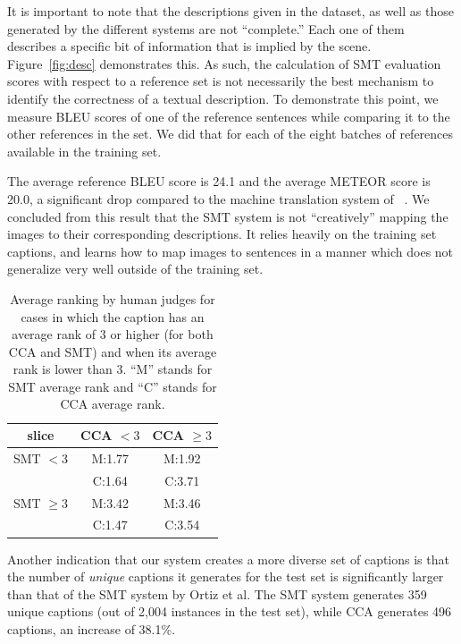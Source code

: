 \documentclass[letterpaper]{article}
\newcommand{\newcite}[1]{\citeauthor{#1}~\shortcite{#1}}
\begin{document}
It is important to note that the descriptions given in the dataset, as well as those generated by the different systems are not ``complete.'' Each one of them describes
a specific bit of information that is implied by the scene. Figure~\ref{fig:desc} demonstrates this. As such, the calculation of SMT evaluation scores with respect to
a reference set is not necessarily the best mechanism to identify the correctness of a textual description.
To demonstrate this point, we measure BLEU scores of one of the reference
sentences while comparing it to the other references in the set. We did that for each of the eight batches of references available in the training set.


The average reference BLEU score is 24.1 and the average METEOR score is 20.0, a significant drop compared to the machine translation system of \newcite{ortiz2015learning}.
We concluded from this result that the SMT system is not ``creatively'' mapping the images to their corresponding descriptions. It relies heavily on the training set captions,
and learns how to map images to sentences in a manner which does not generalize very well outside of the training set.

\begin{table}
\begin{center}
\begin{tabular}{|c||c|c|}
\hline
slice & CCA $< 3$ & CCA $ \ge 3$ \\
\hline
\hline
SMT $< 3$ & M:1.77 & M:1.92 \\
         & C:1.64 & C:3.71 \\
\hline
SMT $\ge 3$ & M:3.42 & M:3.46 \\
         & C:1.47 & C:3.54 \\
\hline
\end{tabular}
\end{center}
\caption{Average ranking by human judges for cases in which the caption has an average rank of $3$ or higher (for both CCA and SMT) and when its average rank is lower than $3$. ``M'' stands for SMT average rank and ``C'' stands for CCA
average rank.\label{table:ranking}}
\end{table}


Another indication that our system creates a more diverse set of captions is that the number of {\em unique} captions it generates for the test set
is significantly larger than that of the SMT system by Ortiz et al. The SMT system generates 359 unique captions (out of 2,004 instances in the test set), while CCA
generates 496 captions, an increase of 38.1\%.
\end{document}
